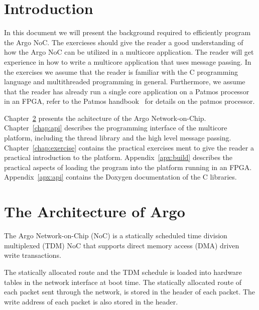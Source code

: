 \documentclass[a4paper,fontsize=10pt,twoside,DIV15,BCOR12mm,headinclude=true,footinclude=false,pagesize,bibtotoc]{scrbook}
\begin{document}
\mainmatter

\chapter{Introduction}

In this document we will present the background required to efficiently program the Argo NoC.
The exercieses should give the reader a good understanding of how the Argo NoC can be utilized in a multicore application.
The reader will get experience in how to write a multicore application that uses message passing.
In the exercises we assume that the reader is familiar with the C programming language and multithreaded programming in general.
Furthermore, we assume that the reader has already run a single core application on a Patmos processor in an FPGA, refer to the Patmos handbook~\cite{patmos-handbook} for details on the patmos processor.


Chapter~\ref{chap:arch} presents the achitecture of the Argo Network-on-Chip.
Chapter~\ref{chap:api} describes the programming interface of the multicore platform, including the thread library and the high level message passing.
Chapter~\ref{chap:exercise} contains the practical exercises ment to give the reader a practical introduction to the platform.
Appendix~\ref{apx:build} describes the practical aspects of loading the program into the platform running in an FPGA.
Appendix~\ref{apx:api} contains the Doxygen documentation of the C libraries.


\chapter{The Architecture of Argo}
\label{chap:arch}
The Argo Network-on-Chip (NoC) is a statically scheduled
time division multiplexed (TDM) NoC that supports
direct memory access (DMA) driven write transactions.

The statically allocated route and the TDM schedule is loaded
into hardware tables in the network interface at boot time.
The statically allocated route of each packet sent through the
network, is stored in the header of each packet.
The write address of each packet is also stored in the header.
\end{document}
